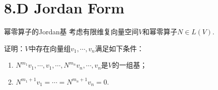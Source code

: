\section{8.D Jordan Form}

\begin{theorem}[8.55]\label{thm 8.55} 幂零算子的Jordan基 \:
    考虑有限维复向量空间\(V\)和幂零算子\(N \in L(V)\).

    证明：\(V\)中存在向量组\(v_1,\cdots,v_n\)满足如下条件：
    \begin{enumerate}
        \item \(N^{m_1}v_1,\cdots,v_1,\cdots,N^{m_n}v_n,\cdots,v_n\)是\(V\)的一组基；
        \item \(N^{m_1+1}v_1=\cdots=N^{m_n+1}v_n=0\).
    \end{enumerate}
\end{theorem}

